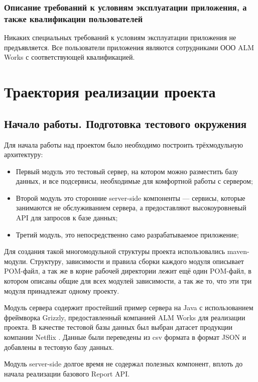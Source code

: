 \documentclass[12pt]{article}
\begin{document}
    \subsubsection{Описание требований к условиям эксплуатации приложения, а также квалификации пользователей}
    Никаких специальных требований к условиям эксплуатации приложения не предъявляется. Все пользователи приложения являются
    сотрудниками ООО ALM Works с соответствующей квалификацией.
    \newpage


    \section{Траектория реализации проекта}

    \subsection{Начало работы. Подготовка тестового окружения}
    Для начала работы над проектом было необходимо построить трёхмодульную архитектуру:
    \begin{itemize}
        \item Первый модуль это тестовый сервер, на котором можно разместить базу данных, и все подсервисы, необходимые для комфортной
        работы с сервером;
        \item Второй модуль это сторонние server-side компоненты --- сервисы, которые занимаются не обслуживанием сервера, а
        предоставляют высокоуровневый API для запросов к базе данных;
        \item Третий модуль, это непосредственно само разрабатываемое приложение;
    \end{itemize}

    Для создания такой многомодульной структуры проекта использовались maven-модули. Структуру, зависимости и правила сборки каждого
    модуля описывает POM-файл, а так же в корне рабочей директории лежит ещё один POM-файл, в котором описаны общие для всех модулей
    зависимости, а так же то, что эти три модуля принадлежат одному проекту.

    Модуль сервера содержит простейший пример сервера на Java с использованием фреймворка Grizzly, предоставленный компанией ALM Works
    для реализации проекта. В качестве тестовой базы данных был выбран датасет продукции компании Netflix \cite{NetflixDB}. Данные
    были переведены из csv формата в формат JSON и добавлены в тестовую базу данных.

    Модуль server-side долгое время не содержал полезных компонент, вплоть до начала реализации базового Report API.
\end{document}
